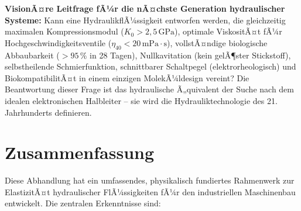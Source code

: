﻿\documentclass[a4paper,12pt]{scrreprt}
\theoremstyle{definition}
\begin{document}
\begin{infobox}
\textbf{VisionÃ¤re Leitfrage fÃ¼r die nÃ¤chste Generation hydraulischer Systeme:}
Kann eine HydraulikflÃ¼ssigkeit entworfen werden, die gleichzeitig
maximalen Kompressionsmodul ($K_0 > 2{,}5\,\mathrm{GPa}$), optimale
ViskositÃ¤t fÃ¼r Hochgeschwindigkeitsventile ($\eta_{40} < 20\,\mathrm{mPa\cdot s}$),
vollstÃ¤ndige biologische Abbaubarkeit ($> 95\,\%$ in 28 Tagen),
Nullkavitation (kein gelÃ¶ster Stickstoff), selbstheilende Schmier\-funktion,
schnittbarer Schaltpegel (elektrorheologisch) und BiokompatibilitÃ¤t
in einem einzigen MolekÃ¼ldesign vereint? Die Beantwortung dieser Frage
ist das hydraulische Ã„quivalent der Suche nach dem idealen elektronischen
Halbleiter -- sie wird die Hydrauliktechnologie des 21. Jahrhunderts definieren.
\end{infobox}

\section{Zusammenfassung}

Diese Abhandlung hat ein umfassendes, physikalisch fundiertes Rahmenwerk
zur ElastizitÃ¤t hydraulischer FlÃ¼ssigkeiten fÃ¼r den industriellen
Maschinenbau entwickelt. Die zentralen Erkenntnisse sind:
\end{document}

